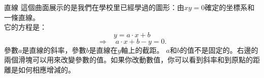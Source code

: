 \begin{surferPage}{直線}
這個曲面展示的是我們在學校里已經學過的圖形：由$xy=0$確定的坐標系和一條直線。\\它的方程是：
\[y=a\cdot x + b\]
\[ \Rightarrow \quad a\cdot x +b -y=0.\]
參數$a$是直線的斜率，參數$b$是直線在$y$軸上的截距。
\newline \newline
$a$和$b$的值不是固定的。右邊的兩個滑塊可以用來改變參數的值。如果你改動數值，你可以看到斜率和到原點的距離是如何相應增減的。
\end{surferPage}

